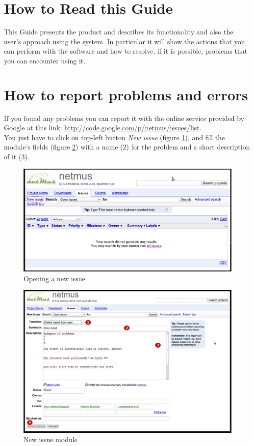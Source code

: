 \section{How to Read this Guide}
This Guide presents the product  and describes its functionality and
also the user's approach using the system. In particular it will show the 
actions that you can perform with the software and how to resolve, if it is
possible, problems that you can encounter using it.

\section{How to report problems and errors}
If you found any problems you can report it with the online service provided by
Google at this link:  \url{http://code.google.com/p/netmus/issues/list}.\\
You just have to click on top-left button \emph{New issue} (figure
\ref{fig:issues}), and fill the module's
fields (figure \ref{fig:newIssue}) with a name (2) for the problem and a short description of it (3). 

\begin{figure}[!htbp]
  \centering
  \includegraphics[width=16cm]{img/MU/issues.png}
\caption{Opening a new issue}
\label{fig:issues}
\end{figure}

\begin{figure}[!htbp]
  \centering
  \includegraphics[width=16cm]{img/MU/new_issue.png}
\caption{New issue module}
\label{fig:newIssue}
\end{figure}

